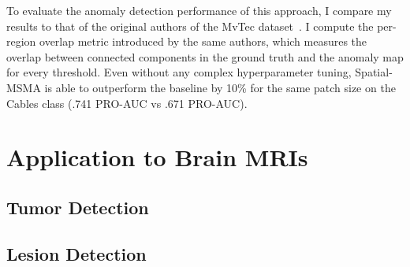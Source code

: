 To evaluate the anomaly detection performance of this approach, I compare my results to that of the original authors of the MvTec dataset~\cite{bergmann2020uninformed}. I compute the per-region overlap metric introduced by the same authors, which measures the overlap between connected components in the ground truth and the anomaly map for every threshold. Even without any complex hyperparameter tuning, Spatial-MSMA is able to outperform the baseline by 10\% for the same patch size on the Cables class (.741 PRO-AUC vs .671 PRO-AUC).


\section{Application to Brain MRIs}

\subsection{Tumor Detection}

\subsection{Lesion Detection}
